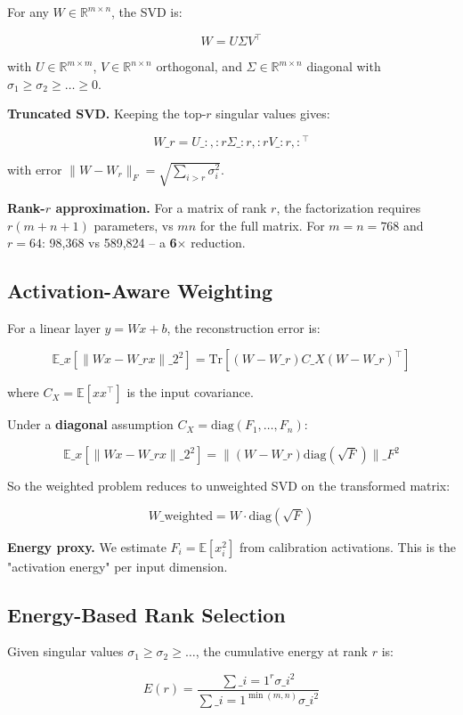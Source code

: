 For any $W \in \mathbb{R}^{m \times n}$, the SVD is:

\[
W = U \Sigma V^\top
\]

with $U \in \mathbb{R}^{m \times m}$, $V \in \mathbb{R}^{n \times n}$ 
orthogonal, and $\Sigma \in \mathbb{R}^{m \times n}$ diagonal with 
$\sigma_1 \geq \sigma_2 \geq \dots \geq 0$.

\textbf{Truncated SVD.} Keeping the top-$r$ singular values gives:

\[
W\_r = U\_{:, :r} \Sigma\_{:r, :r} V\_{:r, :}^\top
\]

with error $\|W - W_r\|_F = \sqrt{\sum_{i > r} \sigma_i^2}$.

\textbf{Rank-$r$ approximation.} For a matrix of rank $r$, the factorization 
requires $r(m + n + 1)$ parameters, vs $mn$ for the full matrix. For 
$m = n = 768$ and $r = 64$: 98,368 vs 589,824 -- a \textbf{6$\times$} reduction.

\subsection{Activation-Aware Weighting}

For a linear layer $y = Wx + b$, the reconstruction error is:

\[
\mathbb{E}\_x[\|Wx - W\_r x\|\_2^2] = \text{Tr}[(W - W\_r) C\_X (W - W\_r)^\top]
\]

where $C_X = \mathbb{E}[x x^\top]$ is the input covariance.

Under a \textbf{diagonal} assumption $C_X = \text{diag}(F_1, \dots, F_n)$:

\[
\mathbb{E}\_x[\|Wx - W\_r x\|\_2^2] = \|(W - W\_r) \text{diag}(\sqrt{F})\|\_F^2
\]

So the weighted problem reduces to unweighted SVD on the transformed matrix:

\[
W\_\text{weighted} = W \cdot \text{diag}(\sqrt{F})
\]

\textbf{Energy proxy.} We estimate $F_i = \mathbb{E}[x_i^2]$ from calibration 
activations. This is the "activation energy" per input dimension.

\subsection{Energy-Based Rank Selection}

Given singular values $\sigma_1 \geq \sigma_2 \geq \dots$, the cumulative 
energy at rank $r$ is:

\[
E(r) = \frac{\sum\_{i=1}^r \sigma\_i^2}{\sum\_{i=1}^{\min(m, n)} \sigma\_i^2}
\]


